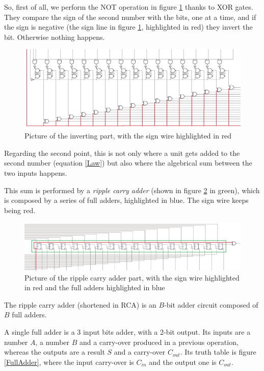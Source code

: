 \documentclass{article}
\begin{document}
So, first of all, we perform the NOT operation in figure \ref{Processing1} thanks to XOR gates. They compare the sign of the second number with the bits, one at a time, and if the sign is negative (the sign line in figure \ref{Processing1}, highlighted in red) they invert the bit. Otherwise nothing happens.

\begin{figure}[h]
  \centering
  \includegraphics[scale=0.35]{SC_Processing1.JPG}
  \caption{Picture of the inverting part, with the sign wire highlighted in red}
  \label{Processing1}
\end{figure}

Regarding the second point, this is not only where a unit gets added to the second number (equation \ref{Law}) but also where the algebrical sum between the two inputs happens.

This sum is performed by a \textit{ripple carry adder} (shown in figure \ref{RCA} in green), which is composed by a series of full adders, highlighted in blue. The sign wire keeps being red.

\begin{figure}[h]
  \centering
  \includegraphics[scale=0.43]{SC_Processing2.JPG}
  \caption{Picture of the ripple carry adder part, with the sign wire highlighted in red and the full adders highlighted in blue}
  \label{RCA}
\end{figure}

The ripple carry adder (shortened in RCA) is an $B$-bit adder circuit composed of $B$ full adders. 

A single full adder is a 3 input bits adder, with a 2-bit output. Its inputs are a number $A$, a number $B$ and a carry-over produced in a previous operation, whereas the outputs are a result $S$ and a carry-over $C_{out}$. Its truth table is figure \ref{FullAdder}, where the input carry-over is $C_{in}$ and the output one is $C_{out}$.
\end{document}
